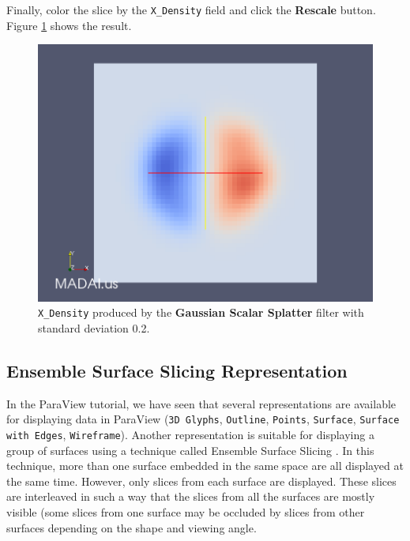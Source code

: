 \documentclass[12pt]{article}
\newcommand{\filter}[1]{\textbf{#1}}
\newcommand{\representation}[1]{\texttt{#1}}
\newcommand{\setting}[1]{\textbf{#1}}
\newcommand{\field}[1]{\texttt{#1}}
\begin{document}
Finally, color the slice by the \field{X\_Density} field and click the \setting{Rescale} button. Figure \ref{fig:GaussianScalarSplatter2} shows the result.

\begin{figure}[htbp]
   \centering
   \includegraphics[scale=.25]{images/GaussianScalarSplatterXDensity.png}
   \caption{\texttt{X\_Density} produced by the \filter{Gaussian Scalar Splatter} filter with standard deviation 0.2.}
   \label{fig:GaussianScalarSplatter2}
\end{figure}

\subsection{Ensemble Surface Slicing Representation}

In the ParaView tutorial, we have seen that several representations are available for displaying data in ParaView (\representation{3D Glyphs}, \representation{Outline}, \representation{Points}, \representation{Surface}, \representation{Surface with Edges}, \representation{Wireframe}). Another representation is suitable for displaying a group of surfaces using a technique called Ensemble Surface Slicing \cite{Oluwafemi2012}. In this technique, more than one surface embedded in the same space are all displayed at the same time. However, only slices from each surface are displayed. These slices are interleaved in such a way that the slices from all the surfaces are mostly visible (some slices from one surface may be occluded by slices from other surfaces depending on the shape and viewing angle.
\end{document}
